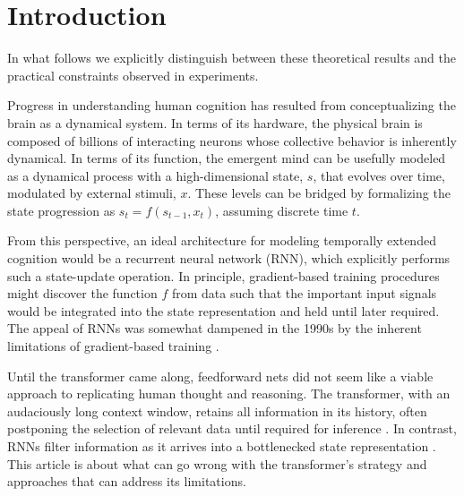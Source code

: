 \documentclass{article}
\begin{document}
\section{Introduction}
In what follows we explicitly distinguish between these theoretical results and the practical constraints observed in experiments.


Progress in understanding human cognition has resulted from conceptualizing the
brain as a dynamical system.
In terms of its hardware, the physical brain is composed of billions of interacting neurons whose collective behavior is inherently dynamical. In terms of its function, the emergent mind can be usefully modeled as a dynamical process with a high-dimensional state, $s$, that evolves over time, modulated by external stimuli, $x$. These levels can be bridged by formalizing the state progression as $s_t= f(s_{t-1}, x_t)$, assuming discrete time $t$.

From this perspective, an ideal architecture for modeling temporally extended cognition would be a recurrent neural network (RNN), which explicitly performs such a state-update operation. In principle, gradient-based training procedures might discover the function $f$ from data such that the important input signals would be integrated into the state representation and held until later required.  The appeal of RNNs was somewhat dampened in the 1990s by the inherent limitations of gradient-based training \citep{mozer1992,hochreiter1998,hochreiter2001}.

Until the transformer \citep{Vaswanietal2017} came along, feedforward nets did not seem like a viable approach to replicating human thought and reasoning.
The transformer, with an audaciously long context window, retains all information in its history, often postponing the selection of relevant data until required for inference \citep{meng2022locating}.
In contrast, RNNs filter information as it arrives into a bottlenecked state
representation \citep{hochreiter1997long}. This article is about what can go wrong with the transformer's strategy and approaches that can address its limitations.
\end{document}

